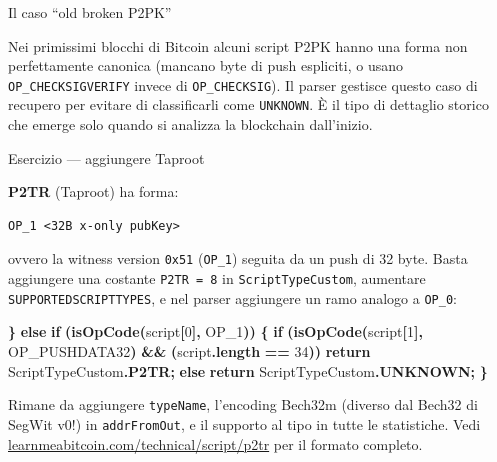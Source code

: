 \documentclass[
  italian,
  openany]{book}
\newenvironment{Shaded}{\begin{snugshade}}{\end{snugshade}}
\newcommand{\ControlFlowTok}[1]{\textcolor[rgb]{0.13,0.29,0.53}{\textbf{#1}}}
\newcommand{\DecValTok}[1]{\textcolor[rgb]{0.00,0.00,0.81}{#1}}
\newcommand{\FunctionTok}[1]{\textcolor[rgb]{0.13,0.29,0.53}{\textbf{#1}}}
\newcommand{\NormalTok}[1]{#1}
\newcommand{\OperatorTok}[1]{\textcolor[rgb]{0.81,0.36,0.00}{\textbf{#1}}}
\begin{document}
\begin{calloutwarning}{Il caso “old broken P2PK”}

Nei primissimi blocchi di Bitcoin alcuni script P2PK hanno una forma non
perfettamente canonica (mancano byte di push espliciti, o usano
\texttt{OP\_CHECKSIGVERIFY} invece di \texttt{OP\_CHECKSIG}). Il parser
gestisce questo caso di recupero per evitare di classificarli come
\texttt{UNKNOWN}. È il tipo di dettaglio storico che emerge solo quando
si analizza la blockchain dall'inizio.

\end{calloutwarning}

\begin{callouttip}{Esercizio — aggiungere Taproot}

\textbf{P2TR} (Taproot) ha forma:

\begin{verbatim}
OP_1 <32B x-only pubKey>
\end{verbatim}

ovvero la witness version \texttt{0x51} (\texttt{OP\_1}) seguita da un
push di 32 byte. Basta aggiungere una costante \texttt{P2TR\ =\ 8} in
\texttt{ScriptTypeCustom}, aumentare \texttt{SUPPORTEDSCRIPTTYPES}, e
nel parser aggiungere un ramo analogo a \texttt{OP\_0}:

\begin{Shaded}
\begin{Highlighting}[]
\OperatorTok{\}} \ControlFlowTok{else} \ControlFlowTok{if} \OperatorTok{(}\FunctionTok{isOpCode}\OperatorTok{(}\NormalTok{script}\OperatorTok{[}\DecValTok{0}\OperatorTok{],}\NormalTok{ OP\_1}\OperatorTok{))} \OperatorTok{\{}
    \ControlFlowTok{if} \OperatorTok{(}\FunctionTok{isOpCode}\OperatorTok{(}\NormalTok{script}\OperatorTok{[}\DecValTok{1}\OperatorTok{],}\NormalTok{ OP\_PUSHDATA32}\OperatorTok{)} \OperatorTok{\&\&} \OperatorTok{(}\NormalTok{script}\OperatorTok{.}\FunctionTok{length} \OperatorTok{==} \DecValTok{34}\OperatorTok{))}
        \ControlFlowTok{return}\NormalTok{ ScriptTypeCustom}\OperatorTok{.}\FunctionTok{P2TR}\OperatorTok{;}
    \ControlFlowTok{else} \ControlFlowTok{return}\NormalTok{ ScriptTypeCustom}\OperatorTok{.}\FunctionTok{UNKNOWN}\OperatorTok{;}
\OperatorTok{\}}
\end{Highlighting}
\end{Shaded}

Rimane da aggiungere \texttt{typeName}, l'encoding Bech32m (diverso dal
Bech32 di SegWit v0!) in \texttt{addrFromOut}, e il supporto al tipo in
tutte le statistiche. Vedi
\href{https://learnmeabitcoin.com/technical/script/p2tr/}{learnmeabitcoin.com/technical/script/p2tr}
per il formato completo.

\end{callouttip}
\end{document}
